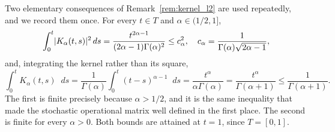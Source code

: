 \documentclass[11pt, a4paper]{article}
\theoremstyle{theoremstyle}
\theoremstyle{definitionstyle}
\newcommand{\dd}{\mathop{}\!d}
\DeclarePairedDelimiter{\abs}{\lvert}{\rvert}
\begin{document}
Two elementary consequences of Remark~\ref{rem:kernel_l2} are used repeatedly, and we record them once. For every $t \in T$ and $\alpha \in (1/2, 1]$,
\begin{equation}\label{eq:kernel_bounds}
    \int_0^t \abs{K_\alpha(t, s)}^2 \dd{s} = \frac{t^{2\alpha - 1}}{(2\alpha-1)\Gamma(\alpha)^2} \leq c_\alpha^2, \quad c_\alpha = \frac 1{\Gamma(\alpha)\sqrt{2\alpha - 1}},
\end{equation}
and, integrating the kernel rather than its square,
\begin{equation}\label{eq:kernel_l1}
    \int_0^t K_\alpha(t, s)\dd{s} = \frac 1{\Gamma(\alpha)}\int_0^t (t-s)^{\alpha - 1}\dd{s} = \frac{t^\alpha}{\alpha \Gamma(\alpha)} = \frac{t^\alpha}{\Gamma(\alpha + 1)} \leq \frac 1{\Gamma(\alpha+1)}.
\end{equation}
The first is finite precisely because $\alpha > 1/2$, and it is the same inequality that made the stochastic operational matrix well defined in the first place. The second is finite for every $\alpha > 0$. Both bounds are attained at $t = 1$, since $T = [0, 1]$.
\end{document}
